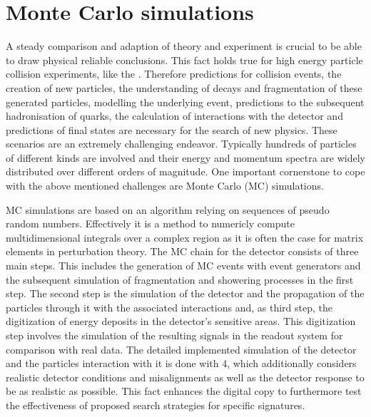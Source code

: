 \section{Monte Carlo simulations}\label{MCsim}
A steady comparison and adaption of theory and experiment is crucial to be able to draw physical reliable conclusions. This fact holds true for high energy particle collision experiments, like the {\LHC}. Therefore predictions for collision events, the creation of new particles, the understanding of decays and fragmentation of these generated particles, modelling the underlying event, predictions to the subsequent hadronisation of quarks, the calculation of interactions with the detector and predictions of final states are necessary for the search of new physics. These scenarios are an extremely challenging endeavor. Typically hundreds of particles of different kinds are involved and their energy and momentum spectra are widely distributed over different orders of magnitude. One important cornerstone to cope with the above mentioned challenges are Monte Carlo (MC) simulations. \cite{bigMC}\par
MC simulations are based on an algorithm relying on sequences of pseudo random numbers. Effectively it is a method to numericly compute multidimensional integrals over a complex region as it is often the case for matrix elements in perturbation theory. \cite{MCbook} The MC chain for the {\ATLAS} detector consists of three main steps. This includes the generation of MC events with event generators and the subsequent simulation of fragmentation and showering processes in the first step. The second step is the simulation of the detector and the propagation of the particles through it with the associated interactions and, as third step, the digitization of energy deposits in the detector's sensitive areas. This digitization step involves the simulation of the resulting signals in the readout system for comparison with real data. The detailed implemented simulation of the detector and the particles interaction with it is done with {\GEANT}4\cite{GEANT4}, which additionally considers realistic detector conditions and misalignments as well as the detector response to be as realistic as possible. This fact enhances the digital copy to furthermore test the effectiveness of proposed search strategies for specific signatures. \cite{ATLASSim}
